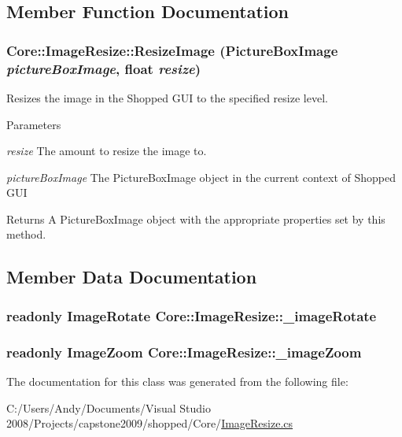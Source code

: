 \subsection{Member Function Documentation}
\hypertarget{class_core_1_1_image_resize_a065ad1dea161a50312691fdb8ebce61f}{
\subsubsection[{ResizeImage}]{ Core::ImageResize::ResizeImage ({\bf PictureBoxImage} {\em pictureBoxImage}, \/  float {\em resize})}}
\label{class_core_1_1_image_resize_a065ad1dea161a50312691fdb8ebce61f}
Resizes the image in the Shopped GUI to the specified resize level.


\begin{DoxyParams}{Parameters}
\item[{\em resize}]The amount to resize the image to. \item[{\em pictureBoxImage}]The PictureBoxImage object in the current context of Shopped GUI \end{DoxyParams}
\begin{DoxyReturn}{Returns}
A PictureBoxImage object with the appropriate properties set by this method. 
\end{DoxyReturn}


\subsection{Member Data Documentation}
\hypertarget{class_core_1_1_image_resize_a6946fcbd49fd5eed96947e7f2a5974d5}{
\subsubsection[{\_\-imageRotate}]{\setlength{\rightskip}{0pt plus 5cm}readonly {\bf ImageRotate} {\bf Core::ImageResize::\_\-imageRotate}}}
\label{class_core_1_1_image_resize_a6946fcbd49fd5eed96947e7f2a5974d5}
\hypertarget{class_core_1_1_image_resize_a8a1b34545392d187bf7fb5c66c37bbc5}{
\subsubsection[{\_\-imageZoom}]{\setlength{\rightskip}{0pt plus 5cm}readonly {\bf ImageZoom} {\bf Core::ImageResize::\_\-imageZoom}}}
\label{class_core_1_1_image_resize_a8a1b34545392d187bf7fb5c66c37bbc5}


The documentation for this class was generated from the following file:\begin{DoxyCompactItemize}
\item 
C:/Users/Andy/Documents/Visual Studio 2008/Projects/capstone2009/shopped/Core/\hyperlink{_image_resize_8cs}{ImageResize.cs}\end{DoxyCompactItemize}
